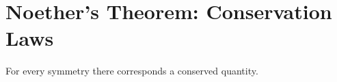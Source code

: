 \section{Noether's Theorem: Conservation Laws}
\label{sec:noether}
\begin{thm}
	For every symmetry there corresponds a conserved quantity.\cite{Noether2005Invariant}
\end{thm}


